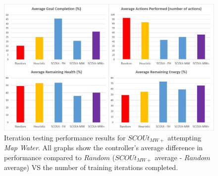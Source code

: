 \begin{figure}[!htb]
  \centering
  \includegraphics[width=1.0\columnwidth]{Figures/Results/Experiment2/AdditionalTraining/MapWaterPlus.JPG}
  \caption[Experiment 2 - Additional Training Testing Results: $SCOUt_{MW+}$]{Iteration testing performance results for $SCOUt_{MW+}$ attempting \textit{Map Water}. All graphs show the controller's average difference in performance compared to $Random$ ($SCOUt_{MW+}$ average - $Random$ average) VS the number of training iterations completed.}
  \label{fig:mapwaterplus_test_results}
\end{figure}



